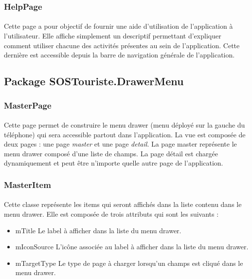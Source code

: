	\subsubsection{HelpPage}
			\paragraph{}
				Cette page a pour objectif de fournir une aide d’utilisation de l’application à l’utilisateur. Elle affiche simplement un descriptif permettant d’expliquer comment utiliser chacune des activités présentes au sein de l’application. Cette dernière est accessible depuis la barre de navigation générale de l’application.
		
\subsection{Package SOSTouriste.DrawerMenu}
	\subsubsection{MasterPage}
		\paragraph{}
			Cette page permet de construire le menu drawer (menu déployé sur la gauche du téléphone) qui sera accessible partout dans l'application. La vue est composée de deux pages : une page \emph{master} et une page \emph{detail}. La page master représente le menu drawer composé d'une liste de champs. La page détail est chargée dynamiquement et peut être n'importe quelle autre page de l'application.
	\subsubsection{MasterItem}
		\paragraph{}
			Cette classe représente les items qui seront affichés dans la liste contenu dans le menu drawer. Elle est composée de trois attributs qui sont les suivants :
			\begin{itemize}
				\item mTitle Le label à afficher dans la liste du menu drawer.
				\item mIconSource L'icône associée au label à afficher dans la liste du menu drawer.
				\item mTargetType Le type de page à charger lorsqu'un champs est cliqué dans le menu drawer.
			\end{itemize}
